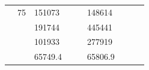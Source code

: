 \begin{table}[]
\begin{tabular}{|cclccllll}
\multicolumn{1}{|c|}{\cellcolor[HTML]{FFFFC7}}                                & \multicolumn{1}{c|}{\multirow{-10}{*}{\cellcolor[HTML]{DAE8FC}75}} & \multicolumn{1}{l|}{\cellcolor[HTML]{DDFDFF}151073}    & \multicolumn{1}{c|}{\cellcolor[HTML]{FFFFC7}}                                & \multicolumn{1}{c|}{\cellcolor[HTML]{DDFDFF}}                       & \multicolumn{1}{l|}{\cellcolor[HTML]{DAE8FC}148614}    &                                                                              &                                                                    &                                                        \\ \cline{2-3} \cline{6-6}
\multicolumn{1}{|c|}{\cellcolor[HTML]{FFFFC7}}                                & \multicolumn{1}{c|}{\cellcolor[HTML]{DDFDFF}}                      & \multicolumn{1}{l|}{\cellcolor[HTML]{DAE8FC}191744}    & \multicolumn{1}{c|}{\cellcolor[HTML]{FFFFC7}}                                & \multicolumn{1}{c|}{\cellcolor[HTML]{DDFDFF}}                       & \multicolumn{1}{l|}{\cellcolor[HTML]{DDFDFF}445441}    &                                                                              &                                                                    &                                                        \\ \cline{3-3} \cline{6-6}
\multicolumn{1}{|c|}{\cellcolor[HTML]{FFFFC7}}                                & \multicolumn{1}{c|}{\cellcolor[HTML]{DDFDFF}}                      & \multicolumn{1}{l|}{\cellcolor[HTML]{DDFDFF}101933}    & \multicolumn{1}{c|}{\cellcolor[HTML]{FFFFC7}}                                & \multicolumn{1}{c|}{\cellcolor[HTML]{DDFDFF}}                       & \multicolumn{1}{l|}{\cellcolor[HTML]{DAE8FC}277919}    &                                                                              &                                                                    &                                                        \\ \cline{3-3} \cline{6-6}
\multicolumn{1}{|c|}{\cellcolor[HTML]{FFFFC7}}                                & \multicolumn{1}{c|}{\cellcolor[HTML]{DDFDFF}}                      & \multicolumn{1}{l|}{\cellcolor[HTML]{DAE8FC}65749.4}   & \multicolumn{1}{c|}{\cellcolor[HTML]{FFFFC7}}                                & \multicolumn{1}{c|}{\cellcolor[HTML]{DDFDFF}}                       & \multicolumn{1}{l|}{\cellcolor[HTML]{DDFDFF}65806.9}   &                                                                              &                                                                    &                                                        \\ \cline{3-3} \cline{6-6}

\end{tabular}
\end{table}
